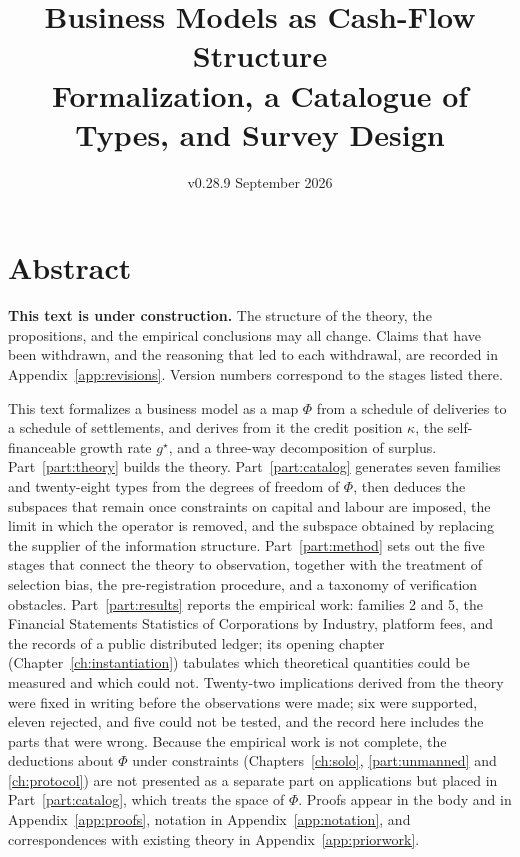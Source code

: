 \documentclass[11pt]{book}
\title{Business Models as Cash-Flow Structure\\[6pt]
\large Formalization, a Catalogue of Types, and Survey Design}
\author{}
\date{v0.28.9\quad 7 September 2026}
\newenvironment{abstract}{\section*{Abstract}}{}
\theoremstyle{definition}
\begin{document}
\maketitle

\begin{abstract}
\noindent
\textbf{This text is under construction.} The structure of the theory, the propositions,
and the empirical conclusions may all change. Claims that have been withdrawn, and the
reasoning that led to each withdrawal, are recorded in Appendix~\ref{app:revisions}.
Version numbers correspond to the stages listed there.

\medskip
This text formalizes a business model as a map $\Phi$ from a schedule of deliveries to a
schedule of settlements, and derives from it the credit position $\kappa$, the
self-financeable growth rate $g^\star$, and a three-way decomposition of surplus.
Part~\ref{part:theory} builds the theory. Part~\ref{part:catalog} generates seven families
and twenty-eight types from the degrees of freedom of $\Phi$, then deduces the subspaces
that remain once constraints on capital and labour are imposed, the limit in which the
operator is removed, and the subspace obtained by replacing the supplier of the information
structure. Part~\ref{part:method} sets out the five stages that connect the theory to
observation, together with the treatment of selection bias, the pre-registration procedure,
and a taxonomy of verification obstacles. Part~\ref{part:results} reports the empirical work:
families 2 and 5, the Financial Statements Statistics of Corporations by Industry, platform
fees, and the records of a public distributed ledger; its opening chapter
(Chapter~\ref{ch:instantiation}) tabulates which theoretical quantities could be measured and
which could not. Twenty-two implications derived from the theory were fixed in writing before
the observations were made; six were supported, eleven rejected, and five could not be tested,
and the record here includes the parts that were wrong. Because the empirical work is not
complete, the deductions about $\Phi$ under constraints (Chapters~\ref{ch:solo},
\ref{part:unmanned} and \ref{ch:protocol}) are not presented as a separate part on
applications but placed in Part~\ref{part:catalog}, which treats the space of $\Phi$.
Proofs appear in the body and in Appendix~\ref{app:proofs}, notation in
Appendix~\ref{app:notation}, and correspondences with existing theory in
Appendix~\ref{app:priorwork}.
\end{abstract}

\tableofcontents
\end{document}

